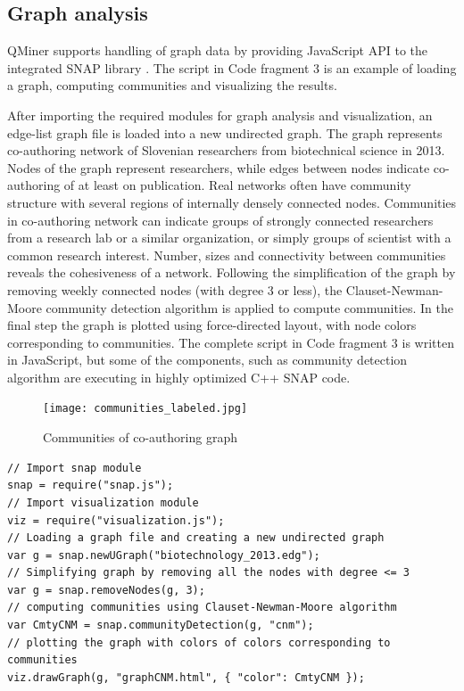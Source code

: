 \documentclass{article} %
\begin{document}
\subsection{Graph analysis}
QMiner supports handling of graph data by providing JavaScript API to the integrated SNAP library \cite{snap}. The script in Code fragment 3 is an example of loading a graph, computing communities and visualizing the results.

After importing the required modules for graph analysis and visualization, an edge-list graph file is loaded into a new undirected graph. The graph represents co-authoring network of Slovenian researchers from biotechnical science in 2013. Nodes of the graph represent researchers, while edges between nodes indicate co-authoring of at least on publication. Real networks often have community structure with several regions of internally densely connected nodes. Communities in co-authoring network can indicate groups of strongly connected researchers from a research lab or a similar organization, or simply groups of scientist with a common research interest. Number, sizes and connectivity between communities reveals the cohesiveness of a network. Following the simplification of the graph by removing weekly connected nodes (with degree 3 or less), the Clauset-Newman-Moore \cite{clauset-newman-moore} community detection algorithm is applied to compute communities. In the final step the graph is plotted using force-directed layout, with node colors corresponding to communities. The complete script in Code fragment 3 is written in JavaScript, but some of the components, such as community detection algorithm are executing in highly optimized C++ SNAP code.

\begin{figure}[h]
\begin{center}
\texttt{[image: communities\_labeled.jpg]}
\caption{Communities of co-authoring graph}
\end{center}
\end{figure}

\begin{lstlisting}[caption=Graph analysis]
// Import snap module
snap = require("snap.js");
// Import visualization module
viz = require("visualization.js");
// Loading a graph file and creating a new undirected graph
var g = snap.newUGraph("biotechnology_2013.edg");
// Simplifying graph by removing all the nodes with degree <= 3
var g = snap.removeNodes(g, 3);
// computing communities using Clauset-Newman-Moore algorithm
var CmtyCNM = snap.communityDetection(g, "cnm");
// plotting the graph with colors of colors corresponding to communities
viz.drawGraph(g, "graphCNM.html", { "color": CmtyCNM });
\end{lstlisting}
\end{document}
